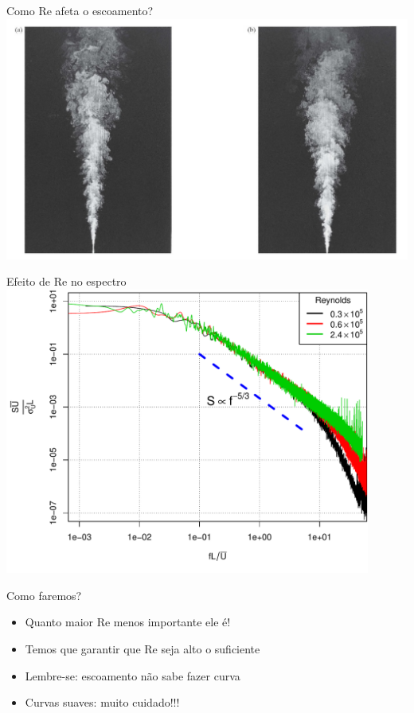 \documentclass{beamer}
\begin{document}
\begin{frame}{Como Re afeta o escoamento?}
  \centering
  \includegraphics[width=\textwidth]{./figuras/jato-reynolds.png}
  
\end{frame}

\begin{frame}{Efeito de Re no espectro}
  \centering
  \includegraphics[width=0.9\textwidth]{./figuras/spec-nd.pdf}
  
\end{frame}

\begin{frame}{Como faremos?}
  \begin{itemize}
  \item Quanto maior Re menos importante ele é!
  \item Temos que garantir que Re seja alto o suficiente
  \item Lembre-se: escoamento não sabe fazer curva
  \item Curvas suaves: muito cuidado!!!
  \end{itemize}

\end{frame}
\end{document}
